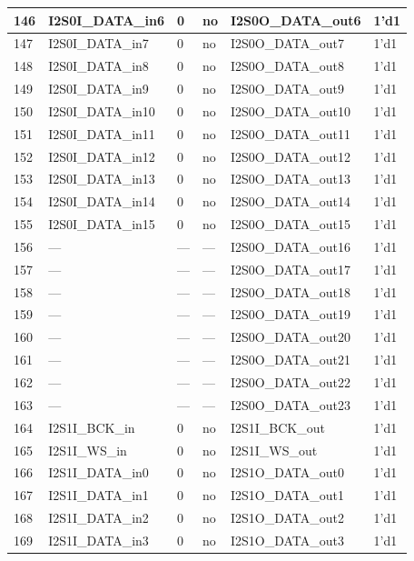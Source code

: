 \begin{longtable}[c]{|p{1cm}|p{3.8cm}|p{2.0cm}|p{2.9cm}|p{4.8cm}|p{3.0cm}| }
    146 & I2S0I\_DATA\_in6 & 0 & no & I2S0O\_DATA\_out6 & 1'd1 \\ \hline
    147 & I2S0I\_DATA\_in7 & 0 & no & I2S0O\_DATA\_out7 & 1'd1 \\ \hline
    148 & I2S0I\_DATA\_in8 & 0 & no & I2S0O\_DATA\_out8 & 1'd1 \\ \hline
    149 & I2S0I\_DATA\_in9 & 0 & no & I2S0O\_DATA\_out9 & 1'd1 \\ \hline
    150 & I2S0I\_DATA\_in10 & 0 & no & I2S0O\_DATA\_out10 & 1'd1 \\ \hline
    151 & I2S0I\_DATA\_in11 & 0 & no & I2S0O\_DATA\_out11 & 1'd1 \\ \hline
    152 & I2S0I\_DATA\_in12 & 0 & no & I2S0O\_DATA\_out12 & 1'd1 \\ \hline
    153 & I2S0I\_DATA\_in13 & 0 & no & I2S0O\_DATA\_out13 & 1'd1 \\ \hline
    154 & I2S0I\_DATA\_in14 & 0 & no & I2S0O\_DATA\_out14 & 1'd1 \\ \hline
    155 & I2S0I\_DATA\_in15 & 0 & no & I2S0O\_DATA\_out15 & 1'd1 \\ \hline
    156 & --- & --- & --- & I2S0O\_DATA\_out16 & 1'd1 \\ \hline
    157 & --- & --- & --- & I2S0O\_DATA\_out17 & 1'd1 \\ \hline
    158 & --- & --- & --- & I2S0O\_DATA\_out18 & 1'd1 \\ \hline
    159 & --- & --- & --- & I2S0O\_DATA\_out19 & 1'd1 \\ \hline
    160 & --- & --- & --- & I2S0O\_DATA\_out20 & 1'd1 \\ \hline
    161 & --- & --- & --- & I2S0O\_DATA\_out21 & 1'd1 \\ \hline
    162 & --- & --- & --- & I2S0O\_DATA\_out22 & 1'd1 \\ \hline
    163 & --- & --- & --- & I2S0O\_DATA\_out23 & 1'd1 \\ \hline
    164 & I2S1I\_BCK\_in & 0 & no & I2S1I\_BCK\_out & 1'd1 \\ \hline
    165 & I2S1I\_WS\_in & 0 & no & I2S1I\_WS\_out & 1'd1 \\ \hline
    166 & I2S1I\_DATA\_in0 & 0 & no & I2S1O\_DATA\_out0 & 1'd1 \\ \hline
    167 & I2S1I\_DATA\_in1 & 0 & no & I2S1O\_DATA\_out1 & 1'd1 \\ \hline
    168 & I2S1I\_DATA\_in2 & 0 & no & I2S1O\_DATA\_out2 & 1'd1 \\ \hline
    169 & I2S1I\_DATA\_in3 & 0 & no & I2S1O\_DATA\_out3 & 1'd1 \\ \hline

\end{longtable}
